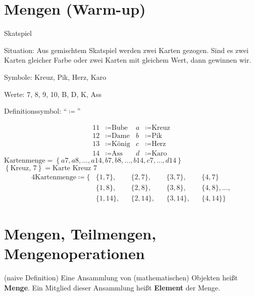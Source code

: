 \documentclass[a4paper]{article}
\begin{document}
\section{Mengen (Warm-up)}
Skatspiel\par
Situation: Aus gemischtem Skatspiel werden zwei Karten gezogen. Sind es zwei Karten gleicher Farbe oder zwei Karten mit gleichem Wert, dann gewinnen wir.\par
Symbole: Kreuz, Pik, Herz, Karo\par
Werte: 7, 8, 9, 10, B, D, K, Ass\par
Definitionssymbol: ``$\coloneqq$''\par
\begin{examplebox}
	\begin{align*}
		11 &\coloneqq \text{Bube}	& a &\coloneqq \text{Kreuz}\\
		12 &\coloneqq \text{Dame}	& b &\coloneqq \text{Pik}\\
		13 &\coloneqq \text{König}	& c &\coloneqq \text{Herz}\\
		14 &\coloneqq \text{Ass}	& d &\coloneqq \text{Karo}
	\end{align*}
	$\text{Kartenmenge} = \left\{a7, a8, ..., a14, b7, b8, ..., b14, c7, ..., d14\right\}$\\
	$\left\{\text{Kreuz, 7}\right\} = \text{Karte Kreuz 7}$
	\begin{alignat*}{4}
		\text{Kartenmenge} \coloneqq \{	&\{1, 7\}, &&\{2, 7\}, &&\{3, 7\}, &&\{4, 7\}\\
		~				&\{1, 8\}, &&\{2, 8\}, &&\{3, 8\}, &&\{4, 8\}, ...,\\
		~				&\{1, 14\}, &&\{2, 14\}, &&\{3, 14\}, &&\{4, 14\}\}
	\end{alignat*}
\end{examplebox}



\section{Mengen, Teilmengen, Mengenoperationen}

\begin{definitionbox}
	(naive Definition) Eine Ansammlung von (mathematischen) Objekten heißt \textbf{Menge}. Ein Mitglied dieser Ansammlung heißt \textbf{Element} der Menge.
\end{definitionbox}
\end{document}
